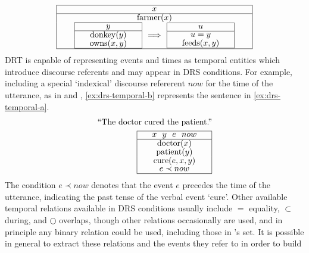 \documentclass[a4paper,12pt,leqno]{article}
\def\drs#1#2{
\renewcommand{\arraystretch}{0.8}
\begin{tabular}[c]{|>{\hspace{1pc}}c<{\hspace{1pc}}|}
	\hline #1 \\
	\hline #2 \\
	\hline
\end{tabular}
\renewcommand{\arraystretch}{1}
}
\begin{document}
\begin{align}
	\drs{$x$}{farmer($x$)\\\drs{$y$}{donkey($y$)\\owns($x,y$)} $\Longrightarrow$ \drs{$u$}{$u = y$\\feeds($x,y$)}}\label{ex:donkey-2-drs}
\end{align}
DRT is capable of representing events and times as temporal entities which introduce discourse referents and may appear in DRS conditions. For example, including a special `indexical' discourse refererent $now$ for the time of the utterance, as in \citet[p. 104]{kamp1988discourse} and \citet{abzianidze2017parallel}, \cref{ex:drs-temporal-b} represents the sentence in \cref{ex:drs-temporal-a}.
\begin{subequations}
	\begin{align}
		\text{``The doctor cured the patient.''}\label{ex:drs-temporal-a}\\
		\drs{$x~~y~~e~~now$}{doctor($x$)\\patient($y$)\\cure($e,x,y$)\\$e \prec now$}\label{ex:drs-temporal-b}
	\end{align}
\end{subequations}
The condition $e \prec now$ denotes that the event $e$ precedes the time of the utterance, indicating the past tense of the verbal event `cure'. Other available temporal relations available in DRS conditions usually include $=$ equality, $\subset$ during, and $\bigcirc$ overlaps, though other relations occasionally are used, and in principle any binary relation could be used, including those in \citet{allen1983maintaining}'s set. It is possible in general to extract these relations and the events they refer to in order to build 
\end{document}
